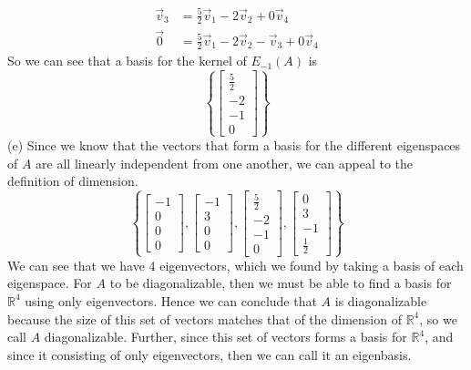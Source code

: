 \documentclass{report}
\begin{document}
$$
\begin{aligned}
\vec{v}_3 & = \frac{5}{2}\vec{v}_1 - 2 \vec{v}_2 + 0\vec{v}_4 \\
\vec{0} & = \frac{5}{2}\vec{v}_1 - 2 \vec{v}_2 - \vec{v}_3 + 0\vec{v}_4
\end{aligned}
$$
So we can see that a basis for the kernel of $E_{-1}(A)$ is
$$
\left\{
\begin{bmatrix}\frac{5}{2}\\-2\\-1\\0\end{bmatrix}
\right\}
$$
(e) Since we know that the vectors that form a basis for the different eigenspaces of $A$ are all linearly independent from one another,  we can appeal to the definition of dimension.
$$
\left\{
\begin{bmatrix}-1\\0\\0\\0\end{bmatrix},
\begin{bmatrix}-1\\3\\0\\0\end{bmatrix},
\begin{bmatrix}\frac{5}{2}\\-2\\-1\\0\end{bmatrix}, 
\begin{bmatrix}0\\3\\-1\\\frac{1}{2}\end{bmatrix}
\right\}
$$
We can see that we have 4 eigenvectors,  which we found by taking a basis of each eigenspace.  For $A$ to be diagonalizable,  then we must be able to find a basis for $\mathbb{R}^4$ using only eigenvectors.  Hence we can conclude that $A$ is diagonalizable because the size of this set of vectors matches that of the dimension of $\mathbb{R}^4$,  so we call $A$ diagonalizable.  Further,  since this set of vectors forms a basis for $\mathbb{R}^4$,  and since it consisting of only eigenvectors,  then we can call it an eigenbasis.
\end{document}
